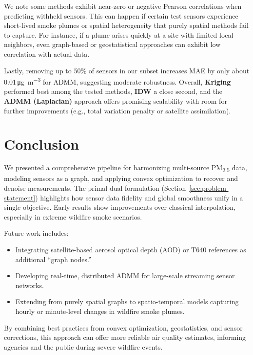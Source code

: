 \documentclass[12pt]{article}                                %
\begin{document}
We note some methods exhibit near-zero or negative Pearson correlations when predicting 
withheld sensors. This can happen if certain test sensors experience short-lived smoke 
plumes or spatial heterogeneity that purely spatial methods fail to capture. For instance, 
if a plume arises quickly at a site with limited local neighbors, even graph-based or 
geostatistical approaches can exhibit low correlation with actual data.

Lastly, removing up to 50\% of sensors in our subset increases MAE by only about 
0.01\,\si{\micro\gram\per\cubic\meter} for ADMM, suggesting moderate robustness. Overall, 
\textbf{Kriging} performed best among the tested methods, \textbf{IDW} a close second, 
and the \textbf{ADMM (Laplacian)} approach offers promising scalability with room for 
further improvements (e.g., total variation penalty or satellite assimilation).

\section{Conclusion}
\label{sec:conclusion}   %

We presented a comprehensive pipeline for harmonizing multi-source PM\textsubscript{2.5} 
data, modeling sensors as a graph, and applying convex optimization to recover and denoise 
measurements. The primal-dual formulation (Section~\ref{sec:problem-statement}) highlights 
how sensor data fidelity and global smoothness unify in a single objective. Early results 
show improvements over classical interpolation, especially in extreme wildfire smoke scenarios.

Future work includes:
\begin{itemize}
    \item Integrating satellite-based aerosol optical depth (AOD) or T640 references as 
          additional “graph nodes.”
    \item Developing real-time, distributed ADMM for large-scale streaming sensor networks.
    \item Extending from purely spatial graphs to spatio-temporal models capturing hourly 
          or minute-level changes in wildfire smoke plumes.
\end{itemize}

By combining best practices from convex optimization, geostatistics, and sensor corrections, 
this approach can offer more reliable air quality estimates, informing agencies and the public 
during severe wildfire events.

\end{document}
